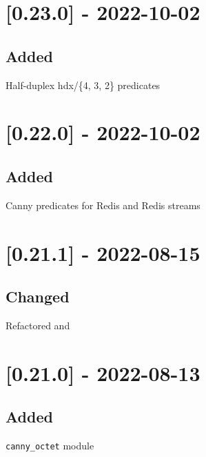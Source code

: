 \section{[0.23.0] - 2022-10-02}

\subsection{Added}

\begin{shortlist}
    \item Half-duplex hdx/\{4, 3, 2\} predicates
\end{shortlist}

\section{[0.22.0] - 2022-10-02}

\subsection{Added}

\begin{shortlist}
    \item Canny predicates for Redis and Redis streams
\end{shortlist}

\section{[0.21.1] - 2022-08-15}

\subsection{Changed}

\begin{shortlist}
    \item Refactored  and 
\end{shortlist}

\section{[0.21.0] - 2022-08-13}

\subsection{Added}

\begin{shortlist}
    \item \verb$canny_octet$ module
\end{shortlist}

